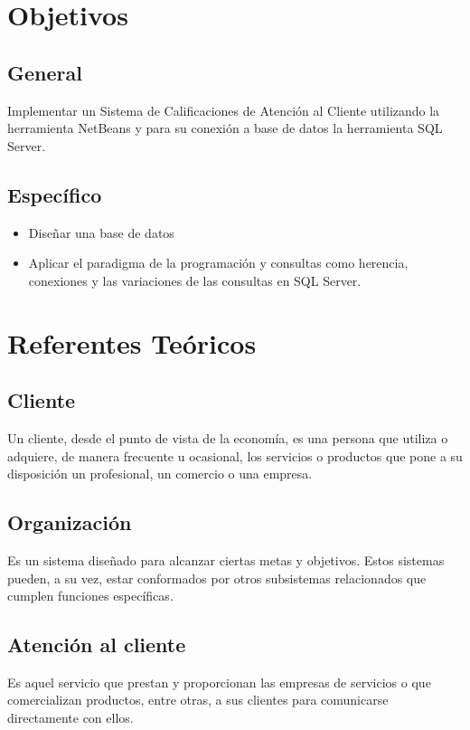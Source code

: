 \documentclass[preprint,12pt]{elsarticle}
\begin{document}
\section{Objetivos}
	\subsection{General }	
		Implementar un Sistema de Calificaciones de Atención al Cliente utilizando la herramienta NetBeans y para su conexión a base de datos la herramienta SQL Server.
	\subsection{Específico }	

\begin{itemize}
	\item Diseñar una base de datos
	\item Aplicar el paradigma  de la programación y consultas como herencia, conexiones y las variaciones de las consultas en SQL Server.
\end{itemize}


\section{Referentes Teóricos}
\subsection{Cliente}
Un cliente, desde el punto de vista de la economía, es una persona que utiliza o adquiere, de manera frecuente u ocasional, los servicios o productos que pone a su disposición un profesional, un comercio o una empresa.
\subsection{Organización}
Es un sistema diseñado para alcanzar ciertas metas y objetivos. Estos sistemas pueden, a su vez, estar conformados por otros subsistemas relacionados que cumplen funciones específicas.
\subsection{Atención al cliente}
Es aquel servicio que prestan y proporcionan las empresas de servicios o que comercializan productos, entre otras, a sus clientes para comunicarse directamente con ellos.
\end{document}
